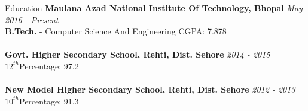 \documentclass{resume} %
\begin{document}

\begin{rSection}{Education}
{\bf Maulana Azad National Institute Of Technology, Bhopal} \hfill {\em May 2016 - Present} 
\\ \textbf{B.Tech.} - Computer Science And Engineering \hfill{CGPA: 7.878}
\\
\\{\bf Govt. Higher Secondary School, Rehti, Dist. Sehore} \hfill {\em 2014 - 2015} 
\\ $12^{th}$\hfill {Percentage: 97.2 }
\\
\\{\bf New Model Higher Secondary School, Rehti, Dist. Sehore} \hfill {\em 2012 - 2013} 
\\ $10^{th}$\hfill {Percentage: 91.3}

\end{rSection}

\end{document}

